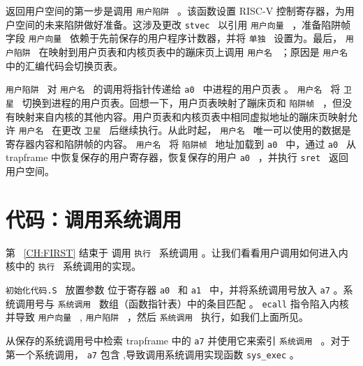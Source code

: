 \documentclass[UTF8]{article}
\begin{document}
返回用户空间的第一步是调用  {    \tt    用户陷阱   } 
        。该函数设置 RISC-V 控制寄存器，为用户空间的未来陷阱做好准备。这涉及更改  {    \tt    stvec   }  以引用  {    \tt    用户向量   }  ，准备陷阱帧字段
  {    \tt    用户向量   }  依赖于先前保存的用户程序计数器，并将  {    \tt    单独   }  设置为。最后， {    \tt    用户陷阱   }  在映射到用户页表和内核页表中的蹦床页上调用  {    \tt    用户名   } ；原因是  {    \tt    用户名   }  中的汇编代码会切换页表。  

 {    \tt    用户陷阱   }  对  {    \tt    用户名   }  的调用将指针传递给  {    \tt    a0   }  中进程的用户页表
        。
  {    \tt    用户名   }  将  {    \tt    卫星   }  切换到进程的用户页表。回想一下，用户页表映射了蹦床页和  {    \tt    陷阱帧   }  ，但没有映射来自内核的其他内容。用户页表和内核页表中相同虚拟地址的蹦床页映射允许
  {    \tt    用户名   }  在更改  {    \tt    卫星   }  后继续执行。从此时起， {    \tt    用户名   }  唯一可以使用的数据是寄存器内容和陷阱帧的内容。
  {    \tt    用户名   }  将  {    \tt    陷阱帧   }  地址加载到  {    \tt    a0   }  中，通过  {    \tt    a0   }  从 trapframe 中恢复保存的用户寄存器，恢复保存的用户  {    \tt    a0   }  ，并执行  {    \tt    sret   }  返回用户空间。  

   \section{代码：调用系统调用  }     

第~    \ref{CH:FIRST}    结束于
        调用  {    \tt    执行   }  系统调用
        。让我们看看用户调用如何进入内核中的  {    \tt    执行   }  系统调用的实现。  

 {    \tt    初始化代码.S   }  放置参数
        位于寄存器  {    \tt    a0   }  和  {    \tt    a1   }  中，并将系统调用号放入
    \texttt{a7}    。系统调用号与  {    \tt    系统调用   }  数组（函数指针表）中的条目匹配
        。    \lstinline{ecall}    指令陷入内核并导致
  {    \tt    用户向量   }  ,
  {    \tt    用户陷阱   }  ，然后  {    \tt    系统调用   }  执行，如我们上面所见。  

        从保存的系统调用号中检索
 trapframe 中的    \texttt{a7}    并使用它来索引  {    \tt    系统调用   }  。对于第一个系统调用，
    \texttt{a7}    包含
        ,导致调用系统调用实现函数
    \lstinline{sys_exec}    。  
\end{document}
